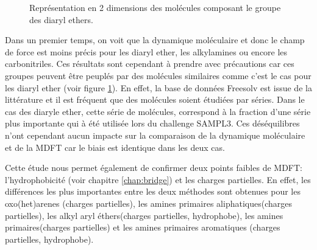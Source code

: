 \begin{figure}[H]
  \centering
  \caption{Représentation en 2 dimensions des molécules composant le groupe des diaryl ethers.}
  \label{fig:diaryl_ether}
\end{figure}

Dans un premier temps, on voit que la dynamique moléculaire et donc le champ de force est moins précis pour les diaryl ether, les alkylamines ou encore les carbonitriles. Ces résultats sont cependant à prendre avec précautions car ces groupes peuvent être peuplés par des molécules similaires comme c'est le cas pour les diaryl ether (voir figure \ref{fig:diaryl_ether}). En effet, la base de données Freesolv est issue de la littérature et il est fréquent que des molécules soient étudiées par séries. Dans le cas des diaryle ether, cette série de molécules, correspond à la fraction d'une série plus importante qui à été utilisée lors du challenge SAMPL3\cite{Geballe_sampl_2012}. Ces déséquilibres n'ont cependant aucun impacte sur la comparaison de la dynamique moléculaire et de la MDFT car le biais est identique dans les deux cas.

Cette étude nous permet également de confirmer deux points faibles de MDFT: l'hydrophobicité (voir chapitre \ref{chap:bridge}) et les charges partielles\cite{ding_thesis}. En effet, les différences les plus importantes entre les deux méthodes sont obtenues pour les oxo(het)arenes (charges partielles), les amines primaires aliphatiques(charges partielles), les alkyl aryl éthers(charges partielles, hydrophobe), les amines primaires(charges partielles) et les amines primaires aromatiques (charges partielles, hydrophobe). 



